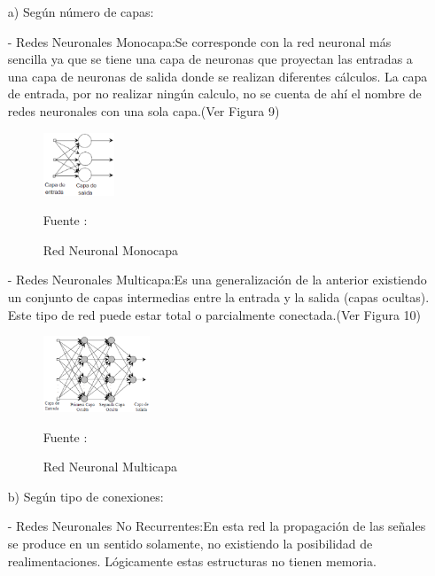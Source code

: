 \documentclass[a4paper, 12pt]{article}
\begin{document}
\begin{enumerate}
\begin{enumerate}
\item[a)] Según número de capas:\par
- Redes Neuronales Monocapa:Se corresponde con la red neuronal más sencilla ya que se tiene una capa de neuronas que proyectan las entradas a una capa de neuronas de salida donde se realizan diferentes cálculos. La capa de entrada, por no realizar ningún calculo, no se cuenta de ahí el nombre de redes neuronales con una sola capa.(Ver Figura 9)\par
\begin{figure}[ht]
\begin{center}
\includegraphics[width=0.2\textwidth]{rna_monocapa}
\end{center}
\begin{center}
\caption{\small{Red Neuronal Monocapa }}
{\small{Fuente : \cite{serrano}}}
\end{center}
\end{figure}
\vskip 4cm
- Redes Neuronales Multicapa:Es una generalización de la anterior existiendo un conjunto de capas intermedias entre la entrada y la salida (capas ocultas). Este tipo de red puede estar total o parcialmente conectada.(Ver Figura 10)\par
\begin{figure}[ht]
\begin{center}
\includegraphics[width=0.3\textwidth]{rna_multicapa}
\end{center}
\begin{center}
\caption{\small{Red Neuronal Multicapa}}
{\small{Fuente : \cite{serrano}}}
\end{center}
\end{figure}
\item[b)] Según tipo de conexiones:\par
- Redes Neuronales No Recurrentes:En esta red la propagación de las señales se produce en un sentido solamente, no existiendo la posibilidad de realimentaciones. Lógicamente estas estructuras no tienen memoria.\par

\end{enumerate}
\end{enumerate}
\end{document}
